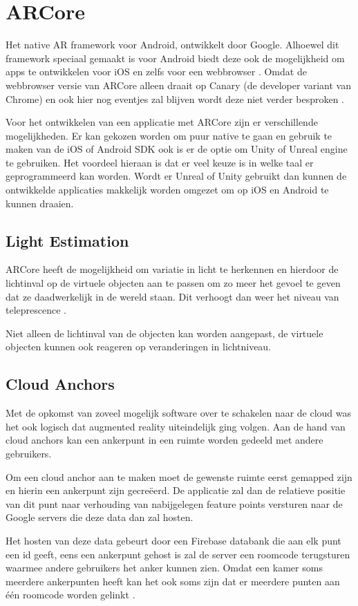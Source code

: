 \section{ARCore}
Het native AR framework voor Android, ontwikkelt door Google. Alhoewel dit framework speciaal gemaakt is voor Android biedt deze ook de mogelijkheid om apps te ontwikkelen voor iOS en zelfs voor een webbrowser \autocite{ARCoreOverview}. Omdat de webbrowser versie van ARCore alleen draait op Canary (de developer variant van Chrome) en ook hier nog eventjes zal blijven wordt deze niet verder besproken \autocite{ARCoreWeb}.

Voor het ontwikkelen van een applicatie met ARCore zijn er verschillende mogelijkheden. Er kan gekozen worden om puur native te gaan en gebruik te maken van de iOS of Android SDK ook is er de optie om Unity of Unreal engine te gebruiken. Het voordeel hieraan is dat er veel keuze is in welke taal er geprogrammeerd kan worden. Wordt er Unreal of Unity gebruikt dan kunnen de ontwikkelde applicaties makkelijk worden omgezet om op iOS en Android te kunnen draaien. 

\subsection{Light Estimation}
ARCore heeft de mogelijkheid om variatie in licht te herkennen en hierdoor de lichtinval op de virtuele objecten aan te passen om zo meer het gevoel te geven dat ze daadwerkelijk in de wereld staan. Dit verhoogt dan weer het niveau van teleprescence \autocite{ARCoreConcepts}.

Niet alleen de lichtinval van de objecten kan worden aangepast, de virtuele objecten kunnen ook reageren op veranderingen in lichtniveau.
\subsection{Cloud Anchors}
Met de opkomst van zoveel mogelijk software over te schakelen naar de cloud was het ook logisch dat augmented reality uiteindelijk ging volgen. Aan de hand van cloud anchors kan een ankerpunt in een ruimte worden gedeeld met andere gebruikers. 

Om een cloud anchor aan te maken moet de gewenste ruimte eerst gemapped zijn en hierin een ankerpunt zijn gecreëerd. De applicatie zal dan de relatieve positie van dit punt naar verhouding van nabijgelegen feature points versturen naar de Google servers die deze data dan zal hosten. 

Het hosten van deze data gebeurt door een Firebase databank die aan elk punt een id geeft, eens een ankerpunt gehost is zal de server een roomcode terugsturen waarmee andere gebruikers het anker kunnen zien. Omdat een kamer soms meerdere ankerpunten heeft kan het ook soms zijn dat er meerdere punten aan één roomcode worden gelinkt \autocite{ARCoreCloudAnchors}.
